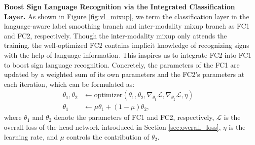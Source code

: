 \documentclass[10pt,twocolumn,letterpaper]{article}
\begin{document}
\noindent\textbf{Boost Sign Language Recognition via the Integrated Classification Layer.} As shown in Figure \ref{fig:vl_mixup}, we term the classification layer in the language-aware label smoothing branch and inter-modality mixup branch as FC1 and FC2, respectively. Though the inter-modality mixup only attends the training, the well-optimized FC2 contains implicit knowledge of recognizing signs with the help of language information. This inspires us to integrate FC2 into FC1 to boost sign language recognition. Concretely, the parameters of the FC1 are updated by a weighted sum of its own parameters and the FC2's parameters at each iteration, which can be formulated as:
\begin{equation}
\label{equ:ema}
\begin{split}
\theta_1, \theta_2 &\leftarrow \text{optimizer}(\theta_1, \theta_2, \nabla_{\theta_1}\mathcal{L}, \nabla_{\theta_2}\mathcal{L}, \eta) \\
\theta_1 &\leftarrow \mu\theta_1 + (1-\mu)\theta_2,
\end{split}
\end{equation}
where $\theta_1$ and $\theta_2$ denote the parameters of FC1 and FC2, respectively, $\mathcal{L}$ is the overall loss of the head network introduced in Section \ref{sec:overall_loss}, $\eta$ is the learning rate, and $\mu$ controls the contribution of $\theta_2$.
\end{document}
